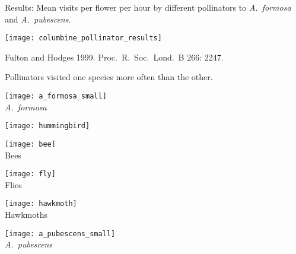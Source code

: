\documentclass[t,hidelinks]{beamer}
\begin{document}
%
\begin{frame}[t]{Results: Mean visits per flower per hour by different pollinators to \textit{A.~formosa} and \textit{A.~pubescens}.}

	{\centering
	\texttt{[image: columbine\_pollinator\_results]}\par
	}

	\vfilll
	
	\tiny Fulton and Hodges 1999. Proc.~R.~Soc.~Lond.~B 266: 2247.
\end{frame}
%
\begin{frame}[t]{Pollinators visited one species more often than the other.}

	\vspace*{-1\baselineskip}
	
	\begin{multicols}{3}
		
		\vspace*{3\baselineskip}
		
		\texttt{[image: a\_formosa\_small]}\\
		\textit{A.~formosa}
				
	\columnbreak
	
		\begin{center}
			
		\texttt{[image: hummingbird]}\\
		\vspace*{-0.5ex}{\footnotesize Hummingbirds}
		
		\bigskip

		\texttt{[image: bee]}\\
		{\footnotesize Bees}
		
		\bigskip
		
		\texttt{[image: fly]}\\
		{\footnotesize Flies}
		
		\bigskip
	
		\texttt{[image: hawkmoth]}\\
		{\footnotesize Hawkmoths}
		
		\end{center}
	\columnbreak
	
		\vspace*{3\baselineskip}

		\hfill \texttt{[image: a\_pubescens\_small]}\\
		\hfill \textit{A.~pubescens}
		

\end{multicols}
\end{frame}
\end{document}
